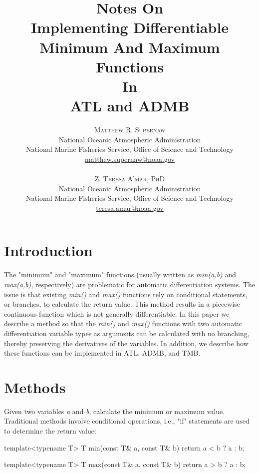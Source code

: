 \documentclass[oneside]{article}
\title{\vspace{-15mm}\fontsize{24pt}{24pt}\selectfont\textbf{Notes On \protect\\  Implementing Differentiable  \protect\\ Minimum And Maximum Functions \protect\\
In \protect\\
ATL and  ADMB}} %
\author{
\large
\textsc{Matthew R. Supernaw}\\[2mm] %
\normalsize National Oceanic Atmospheric Administration \\ %
\normalsize National Marine Fisheries Service, Office of Science and Technology\\ %
\normalsize \href{mailto:matthew.supernaw@noaa.gov}{matthew.supernaw@noaa.gov} \\ %
\\
\textsc{Z. Teresa A'mar, PhD}\\[2mm] %
\normalsize National Oceanic Atmospheric Administration \\ %
\normalsize National Marine Fisheries Service, Office of Science and Technology\\ %
\normalsize \href{mailto:teresa.amar@noaa.gov}{teresa.amar@noaa.gov} \\%
\vspace{-5mm}
}
\date{}
\begin{document}
\maketitle %

\thispagestyle{fancy} %


%
%
%


\newpage
\tableofcontents
\newpage

\section{Introduction}

The "minimum" and "maximum" functions (usually written as \textit{min(a,b)} and \textit{max(a,b)}, respectively) are problematic for automatic differentiation systems. The issue is that existing \textit{min()} and \textit{max()} functions rely on conditional statements, or branches, to calculate the return value. This method results in a piecewise continuous function which is not generally differentiable.  In this paper we describe a method so that the \textit{min()} and \textit{max()} functions with two automatic differentiation variable types as arguments can be calculated with no branching, thereby preserving the derivatives of the variables. In addition, we describe how these functions can be implemented in ATL, ADMB, and TMB.


\section{Methods}

Given two variables \textit{a} and \textit{b}, calculate the minimum or maximum value. Traditional methods involve conditional operations, i.e., "if" statements are used to determine the return value:

\begin{cppsource}
template<typename T>
T min(const T& a, const T& b){
   return a < b ? a : b;
}

template<typename T>
T max(const T& a, const T& b){
   return a > b ? a : b;
}

\end{cppsource}
\end{document}
